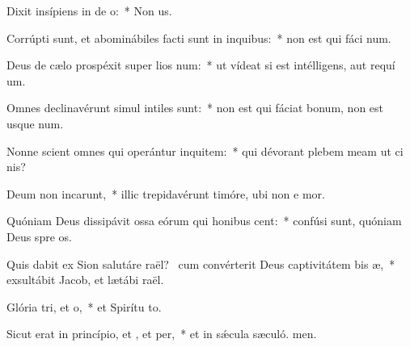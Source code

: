 \item Dixit insípiens in de o:~* Non  us.
\item Corrúpti sunt, et abominábiles facti sunt in inquibus:~* non est qui fáci num.
\item Deus de cælo prospéxit super lios num:~* ut vídeat si est intélligens, aut requí um.
\item Omnes declinavérunt simul intiles  sunt:~* non est qui fáciat bonum, non est usque  num.
\item Nonne scient omnes qui operántur inquitem:~* qui dévorant plebem meam ut ci nis?
\item Deum non incarunt,~* illic trepidavérunt timóre, ubi non e mor.
\item Quóniam Deus dissipávit ossa eórum qui honibus cent:~* confúsi sunt, quóniam Deus spre os.
\item Quis dabit ex Sion salutáre raël?~\pscross{} cum convérterit Deus captivitátem bis æ,~* exsultábit Jacob, et lætábi raël.
\item Glória tri, et o,~* et Spirítu to.
\item Sicut erat in princípio, et , et per,~* et in sǽcula sæculó. men.
